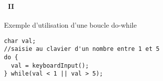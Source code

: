 \begin{frame}[containsverbatim]
  \frametitle{\secname}
  \framesubtitle{\subsecname~II}

  \begin{exampleblock}{Exemple d'utilisation d'une boucle do-while}  
    \begin{verbatim}
char val;
//saisie au clavier d'un nombre entre 1 et 5
do {
  val = keyboardInput();
} while(val < 1 || val > 5);\end{verbatim}
  \end{exampleblock}
\end{frame}

